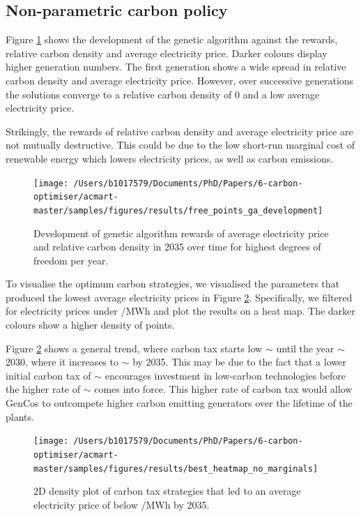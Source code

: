 \documentclass[sigconf]{acmart}
\begin{document}
\subsection{Non-parametric carbon policy}
\label{sssec:result_non_parametric_strategy}

Figure \ref{fig:free_points_ga_development} shows the development of the genetic algorithm against the rewards, relative carbon density and average electricity price. Darker colours display higher generation numbers. The first generation shows a wide spread in relative carbon density and average electricity price. However, over successive generations the solutions converge to a relative carbon density of 0 and a low average electricity price. 

Strikingly, the rewards of relative carbon density and average electricity price are not mutually destructive. This could be due to the low short-run marginal cost of renewable energy which lowers electricity prices, as well as carbon emissions.



\begin{figure}
\centering
\texttt{[image: /Users/b1017579/Documents/PhD/Papers/6-carbon-optimiser/acmart-master/samples/figures/results/free\_points\_ga\_development]}
\caption{Development of genetic algorithm rewards of average electricity price and relative carbon density in 2035 over time for highest degrees of freedom per year.}
\label{fig:free_points_ga_development}
\end{figure}

To visualise the optimum carbon strategies, we visualised the parameters that produced the lowest average electricity prices in Figure \ref{fig:heatmap_of_free_points}. Specifically, we filtered for electricity prices under /MWh and plot the results on a heat map. The darker colours show a higher density of points. 

Figure \ref{fig:heatmap_of_free_points} shows a general trend, where carbon tax starts low ${\sim}$ until the year ${\sim}$2030, where it increases to ${\sim}$ by 2035. This may be due to the fact that a lower initial carbon tax of ${\sim}$ encourages investment in low-carbon technologies  before the higher rate of ${\sim}$ comes into force. This higher rate of carbon tax would allow GenCos to outcompete higher carbon emitting generators over the lifetime of the plants.

\begin{figure}
\centering
\texttt{[image: /Users/b1017579/Documents/PhD/Papers/6-carbon-optimiser/acmart-master/samples/figures/results/best\_heatmap\_no\_marginals]}
\caption{2D density plot of carbon tax strategies that led to an average electricity price of below /MWh by 2035.}
\label{fig:heatmap_of_free_points}
\end{figure}
\end{document}
